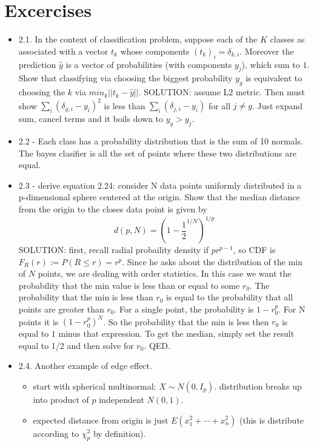 \documentclass[a4paper]{report}
\newcommand{\<}{\textless}
\renewcommand{\>}{\textgreater}
\begin{document}
\section{Excercises}
\begin{itemize}
  \item 2.1. In the context of classification problem, suppose each of the $K$ classes as associated with a vector $t_k$ whose components $(t_k)_i = \delta_{k,i}$. Moreover the prediction $\hat{y}$ is a vector of probabilities (with components $y_j$), which sum to $1$. Show that classifying via choosing the biggest probability $y_g$ is equivalent to choosing the $k$ via $min_k || t_k - \hat{y} ||$.
    \subitem SOLUTION: assume L2 metric. Then must show $\sum_i (\delta_{g,i} - y_i)^2$ is less than $\sum_i (\delta_{j,i} - y_i)$ for all $j \neq g$. Just expand sum, cancel terms and it boils down to $y_g > y_j$.
  \item 2.2 - Each class has a probability distribution that is the sum of 10 normals. The bayes clasifier is all the set of points where these two distributions are equal.
  \item 2.3 - derive equation 2.24: consider N data points uniformly distributed in a p-dimensional sphere centered at the origin. Show that the median distance from the origin to the closes data point is given by
    $$ d(p, N) = \left(1 - \frac{1}{2}^{1/N}\right)^{1/p} $$
    \subitem SOLUTION: first, recall radial probaility density if $pr^{p-1}$, so CDF is $F_R(r) := P(R \leq r) = r^p$. Since he asks about the distribution of the min of $N$ points, we are dealing with order statistics. In this case we want the probability that the min value is less than or equal to some $r_0$. 
    The probability that the min is less than $r_0$ is equal to the probability that all points are greater than $r_0$.
    For a single point, the probability is $1-r_0^p$. For N points it is $(1-r_0^p)^N$. 
    So the probability that the min is less then $r_0$ is equal to $1$ minus that expression. To get the median, simply set the result equal to 1/2 and then solve for $r_0$. QED.
  \item 2.4. Another example of edge effect.
    \begin{itemize}
      \item start with spherical multinormal: $X \sim N(0, I_p)$.  distribution breaks up into product of $p$ independent $N(0,1)$.
      \item expected distance from origin is just $E(x_1^2 + \cdots +x_n^2)$ (this is distribute according to $\chi_p^2$ by definition).

\end{itemize}
\end{itemize}
\end{document}

